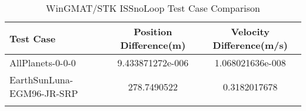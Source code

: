 \begin{table}[htbp!]
\centering
\caption{ WinGMAT/STK ISSnoLoop Test Case Comparison}
      \begin{tabular}{lcc}
      \hline\hline
          Test Case & Position Difference(m) & Velocity Difference(m/s) \\
         \hline
         AllPlanets-0-0-0 & 9.433871272e-006 & 1.068021636e-008 \\
         EarthSunLuna-EGM96-JR-SRP & 278.7490522 & 0.3182017678 \\
      \hline\hline
      \label{Table: ISSnoLoop WinGMAT-STK Table} 
\end{tabular}
\end{table}
